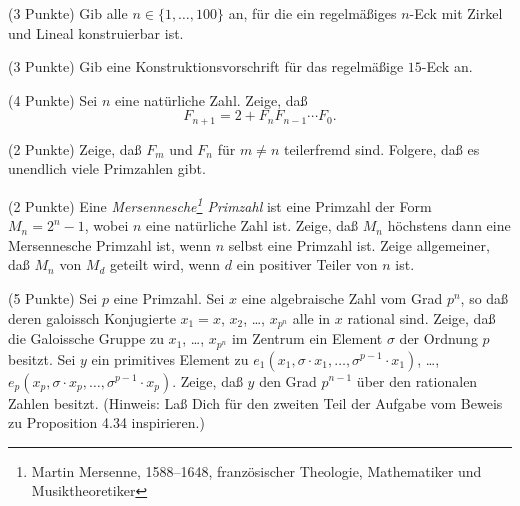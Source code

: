 \documentclass{algsheet}
\author{Dipl.-Math.~Franz Vogler}
\date{25.~Januar 2011}
\begin{document}
                \maketitle





\begin{exercise}(3 Punkte)\newline %
    Gib alle \(n \in \{1, \dotsc, 100\}\) an, für die ein regelmäßiges
    \(n\)-Eck mit Zirkel und Lineal konstruierbar ist.
\end{exercise}

\begin{exercise}(3 Punkte)\newline
    Gib eine Konstruktionsvorschrift für das regelmäßige \(15\)-Eck an.
\end{exercise}

\begin{exercise}(4 Punkte)\newline
    Sei \(n\) eine natürliche Zahl. Zeige, daß
    \begin{equation}
        F_{n + 1} = 2 + F_n F_{n - 1} \dotsm F_0.
    \end{equation}
\end{exercise}

\begin{exercise}(2 Punkte)\newline
    Zeige, daß \(F_m\) und \(F_n\) für \(m \neq n\) teilerfremd sind.
    Folgere, daß es unendlich viele Primzahlen gibt.
\end{exercise}

\begin{exercise}(2 Punkte)\newline
    Eine \emph{Mersennesche\footnote{%
    Martin Mersenne, 1588--1648, französischer Theologie, Mathematiker
    und Musiktheoretiker} Primzahl} ist eine Primzahl der Form
    \(M_n = 2^n - 1\), wobei \(n\) eine natürliche Zahl ist. Zeige, daß
    \(M_n\) höchstens dann eine Mersennesche Primzahl ist, wenn
    \(n\) selbst eine Primzahl ist. Zeige allgemeiner, daß \(M_n\) von
    \(M_d\) geteilt wird, wenn \(d\) ein positiver Teiler von \(n\) ist. 
\end{exercise}


\begin{exercise}(5 Punkte)\newline
    Sei \(p\) eine Primzahl.
    Sei \(x\) eine algebraische Zahl vom Grad \(p^n\), so daß deren galoissch Konjugierte
    \(x_1 = x\), \(x_2\), \dots, \(x_{p^n}\) alle in \(x\) rational sind. Zeige, daß
    die Galoissche Gruppe zu \(x_1\), \dots, \(x_{p^n}\) im Zentrum ein Element \(\sigma\)
    der Ordnung \(p\) besitzt. Sei \(y\) ein primitives Element zu
    \(e_1(x_1, \sigma \cdot x_1, \dotsc, \sigma^{p - 1} \cdot x_1)\), \dots,
    \(e_p(x_p, \sigma \cdot x_p, \dotsc, \sigma^{p - 1} \cdot x_p)\). Zeige,
    daß \(y\) den Grad \(p^{n - 1}\) über den rationalen Zahlen besitzt.
    \newline
    (Hinweis: Laß Dich für den zweiten Teil der Aufgabe vom Beweis zu Proposition 4.34 inspirieren.)
\end{exercise}
\end{document}

